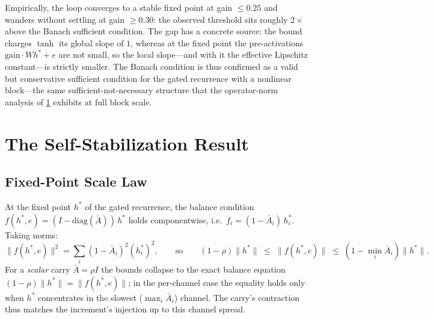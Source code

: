 \documentclass[11pt]{article}
\begin{document}
Empirically, the loop converges to a stable fixed point at gain $\leq 0.25$ and wanders without settling at gain $\geq 0.30$: the observed threshold sits roughly $2\times$ above the Banach sufficient condition. The gap has a concrete source: the bound charges $\tanh$ its global slope of $1$, whereas at the fixed point the pre-activations $\text{gain} \cdot Wh^* + e$ are not small, so the local slope---and with it the effective Lipschitz constant---is strictly smaller. The Banach condition is thus confirmed as a valid but conservative sufficient condition for the gated recurrence with a nonlinear block---the same sufficient-not-necessary structure that the operator-norm analysis of \cref{sec:self-stabilization} exhibits at full block scale.


\section{The Self-Stabilization Result}
\label{sec:self-stabilization}

\subsection{Fixed-Point Scale Law}

At the fixed point $h^*$ of the gated recurrence, the balance condition $f(h^*, e) = (I - \text{diag}(\bar{A}))\,h^*$ holds componentwise, i.e.\ $f_i = (1 - \bar{A}_i)\,h^*_i$. Taking norms:
\begin{equation}
\|f(h^*, e)\|^2 = \sum_i (1 - \bar{A}_i)^2 (h^*_i)^2,
\qquad\text{so}\qquad
(1 - \rho)\|h^*\| \;\le\; \|f(h^*, e)\| \;\le\; (1 - \min_i \bar{A}_i)\|h^*\|.
\label{eq:fixed-point}
\end{equation}
For a \emph{scalar} carry $\bar{A} = \rho I$ the bounds collapse to the exact balance equation $(1-\rho)\|h^*\| = \|f(h^*, e)\|$; in the per-channel case the equality holds only when $h^*$ concentrates in the slowest ($\max_i \bar{A}_i$) channel. The carry's contraction thus matches the increment's injection up to this channel spread.
\end{document}
